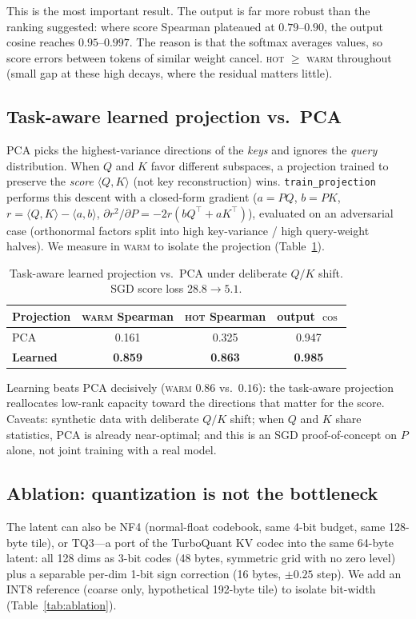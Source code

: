 \documentclass[11pt]{article}
\theoremstyle{plain}
\theoremstyle{definition}
\newcommand{\inner}[2]{\langle #1, #2 \rangle}
\begin{document}
This is the most important result. The output is far more robust than
the ranking suggested: where score Spearman plateaued at $0.79$--$0.90$,
the output cosine reaches $0.95$--$0.997$. The reason is that the softmax
averages values, so score errors between tokens of similar weight cancel.
\textsc{hot} $\ge$ \textsc{warm} throughout (small gap at these high
decays, where the residual matters little).

\subsection{Task-aware learned projection vs.\ PCA}
\label{sec:taskaware}
PCA picks the highest-variance directions of the \emph{keys} and ignores
the \emph{query} distribution. When $Q$ and $K$ favor different
subspaces, a projection trained to preserve the \emph{score}
$\inner{Q}{K}$ (not key reconstruction) wins. \texttt{train\_projection}
performs this descent with a closed-form gradient
($a=PQ$, $b=PK$, $r=\inner{Q}{K}-\inner{a}{b}$,
$\partial r^2/\partial P = -2r(bQ^\top + aK^\top)$), evaluated on an
adversarial case (orthonormal factors split into high key-variance /
high query-weight halves). We measure in \textsc{warm} to isolate the
projection (Table~\ref{tab:taskaware}).

\begin{table}[t]
\centering
\caption{Task-aware learned projection vs.\ PCA under deliberate $Q/K$
shift. SGD score loss $28.8 \to 5.1$.}
\label{tab:taskaware}
\small
\begin{tabular}{@{}lccc@{}}
\toprule
Projection & \textsc{warm} Spearman & \textsc{hot} Spearman & output $\cos$ \\
\midrule
PCA            & 0.161 & 0.325 & 0.947 \\
\textbf{Learned} & \textbf{0.859} & \textbf{0.863} & \textbf{0.985} \\
\bottomrule
\end{tabular}
\end{table}

Learning beats PCA decisively (\textsc{warm} $0.86$ vs.\ $0.16$): the
task-aware projection reallocates low-rank capacity toward the directions
that matter for the score. Caveats: synthetic data with deliberate $Q/K$
shift; when $Q$ and $K$ share statistics, PCA is already near-optimal;
and this is an SGD proof-of-concept on $P$ alone, not joint training with
a real model.

\subsection{Ablation: quantization is not the bottleneck}
\label{sec:ablation}
The latent can also be NF4 (normal-float codebook, same 4-bit budget,
same 128-byte tile), or TQ3---a port of the TurboQuant KV codec into the
same 64-byte latent: all 128 dims as 3-bit codes (48 bytes, symmetric
grid with no zero level) plus a separable per-dim 1-bit sign correction
(16 bytes, $\pm 0.25$ step). We add an INT8 reference (coarse only,
hypothetical 192-byte tile) to isolate bit-width
(Table~\ref{tab:ablation}).
\end{document}
